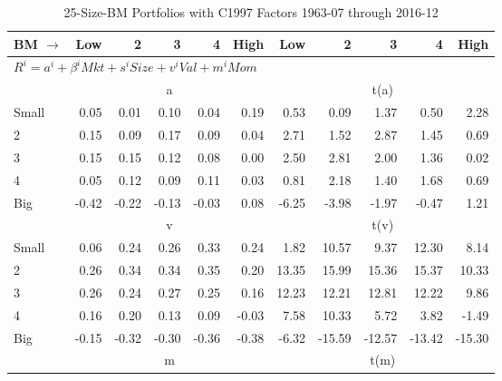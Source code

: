 
\begin{table}[!ht]
\centering
\caption{25-Size-BM Portfolios with C1997 Factors 1963-07 through 2016-12}
\begin{tabular}{lrrrrrrrrrr}
  \toprule
    BM $\rightarrow$ & Low & 2 & 3 & 4 & High & Low & 2 & 3 & 4 & High \\ 
  \midrule
  \multicolumn{11}{l}{$R^i=a^i+\beta^iMkt+s^iSize+v^iVal+m^iMom$} \\

  
    
      & \multicolumn{5}{c}{a} & \multicolumn{5}{c}{t(a)}
    
    \\
      \cmidrule(r){2-6} \cmidrule(r){7-11}

    Small   & 0.05  & 0.01  & 0.10  & 0.04  & 0.19  & 0.53  & 0.09  & 1.37  & 0.50  & 2.28  \\
         2  & 0.15  & 0.09  & 0.17  & 0.09  & 0.04  & 2.71  & 1.52  & 2.87  & 1.45  & 0.69  \\
         3  & 0.15  & 0.15  & 0.12  & 0.08  & 0.00  & 2.50  & 2.81  & 2.00  & 1.36  & 0.02  \\
         4  & 0.05  & 0.12  & 0.09  & 0.11  & 0.03  & 0.81  & 2.18  & 1.40  & 1.68  & 0.69  \\
    Big     & -0.42  & -0.22  & -0.13  & -0.03  & 0.08  & -6.25  & -3.98  & -1.97  & -0.47  & 1.21  \\

  
    
      & \multicolumn{5}{c}{v} & \multicolumn{5}{c}{t(v)}
    
    \\
      \cmidrule(r){2-6} \cmidrule(r){7-11}

    Small   & 0.06  & 0.24  & 0.26  & 0.33  & 0.24  & 1.82  & 10.57  & 9.37  & 12.30  & 8.14  \\
         2  & 0.26  & 0.34  & 0.34  & 0.35  & 0.20  & 13.35  & 15.99  & 15.36  & 15.37  & 10.33  \\
         3  & 0.26  & 0.24  & 0.27  & 0.25  & 0.16  & 12.23  & 12.21  & 12.81  & 12.22  & 9.86  \\
         4  & 0.16  & 0.20  & 0.13  & 0.09  & -0.03  & 7.58  & 10.33  & 5.72  & 3.82  & -1.49  \\
    Big     & -0.15  & -0.32  & -0.30  & -0.36  & -0.38  & -6.32  & -15.59  & -12.57  & -13.42  & -15.30  \\

  
    
      & \multicolumn{5}{c}{m} & \multicolumn{5}{c}{t(m)}
    

\end{tabular}
\end{table}
